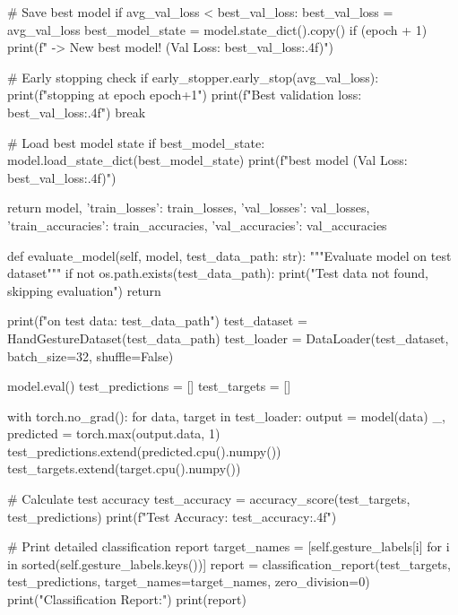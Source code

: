 \begin{aivncodebox}
\begin{python}
            # Save best model
            if avg_val_loss < best_val_loss:
                best_val_loss = avg_val_loss
                best_model_state = model.state_dict().copy()
                if (epoch + 1) %
                    print(f"  -> New best model! (Val Loss: {best_val_loss:.4f})")
            
            # Early stopping check
            if early_stopper.early_stop(avg_val_loss):
                print(f"\nEarly stopping at epoch {epoch+1}")
                print(f"Best validation loss: {best_val_loss:.4f}")
                break
        
        # Load best model state
        if best_model_state:
            model.load_state_dict(best_model_state)
            print(f"\nLoaded best model (Val Loss: {best_val_loss:.4f})")
        
        return model, {
            'train_losses': train_losses,
            'val_losses': val_losses,
            'train_accuracies': train_accuracies,
            'val_accuracies': val_accuracies
        }
    
    def evaluate_model(self, model, test_data_path: str):
        """Evaluate model on test dataset"""
        if not os.path.exists(test_data_path):
            print("Test data not found, skipping evaluation")
            return
        
        print(f"\nEvaluating on test data: {test_data_path}")
        test_dataset = HandGestureDataset(test_data_path)
        test_loader = DataLoader(test_dataset, batch_size=32, shuffle=False)
        
        model.eval()
        test_predictions = []
        test_targets = []
        
        with torch.no_grad():
            for data, target in test_loader:
                output = model(data)
                _, predicted = torch.max(output.data, 1)
                test_predictions.extend(predicted.cpu().numpy())
                test_targets.extend(target.cpu().numpy())
        
        # Calculate test accuracy
        test_accuracy = accuracy_score(test_targets, test_predictions)
        print(f"Test Accuracy: {test_accuracy:.4f}")
        
        # Print detailed classification report
        target_names = [self.gesture_labels[i] for i in sorted(self.gesture_labels.keys())]
        report = classification_report(test_targets, test_predictions, 
                                     target_names=target_names, zero_division=0)
        print("\nDetailed Classification Report:")
        print(report)
    

\end{python}
\end{aivncodebox}
